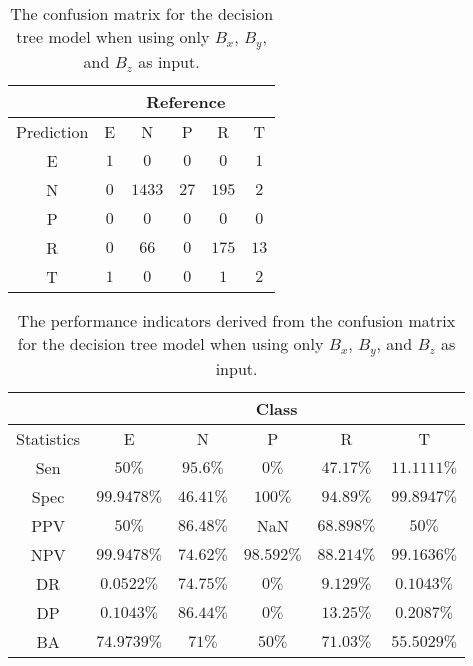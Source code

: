 \begin{table}[!ht]
	\centering
	\begin{tabular}{|c|c|c|c|c|c|}
		\hline
		 & \multicolumn{5}{|c|}{Reference} \\ \hline
		 Prediction & E & N & P & R & T \\ \hline
		 E & $1$ & $0$ & $0$ & $0$ & $1$ \\ \hline
		 N & $0$ & $1433$ & $27$ & $195$ & $2$ \\ \hline
		 P & $0$ & $0$ & $0$ & $0$ & $0$ \\ \hline
		 R & $0$ & $66$ & $0$ & $175$ & $13$ \\ \hline
		 T & $1$ & $0$ & $0$ & $1$ & $2$ \\ \hline
	\end{tabular}
	\caption{The confusion matrix for the decision tree model when using only $B_{x}$, $B_{y}$, and $B_{z}$ as input.}
	\label{tab:cm:coord:C5.0}
\end{table}

\begin{table}[!ht]
	\centering
	\begin{tabular}{|c|c|c|c|c|c|}
		\hline
		 & \multicolumn{5}{c|}{Class} \\ \hline
		Statistics & E & N & P & R & T \\ \hline
		Sen & $50\%$ & $95.6\%$ & $0\%$ & $47.17\%$ & $11.1111\%$ \\ \hline
		Spec & $99.9478\%$ & $46.41\%$ & $100\%$ & $94.89\%$ & $99.8947\%$ \\ \hline
		PPV & $50\%$ & $86.48\%$ & NaN & $68.898\%$ & $50\%$ \\ \hline
		NPV & $99.9478\%$ & $74.62\%$ & $98.592\%$ & $88.214\%$ & $99.1636\%$ \\ \hline
		DR & $0.0522\%$ & $74.75\%$ & $0\%$ & $9.129\%$ & $0.1043\%$ \\ \hline
		DP & $0.1043\%$ & $86.44\%$ & $0\%$ & $13.25\%$ & $0.2087\%$ \\ \hline
		BA & $74.9739\%$ & $71\%$ & $50\%$ & $71.03\%$ & $55.5029\%$ \\ \hline
	\end{tabular}
	\caption{The performance indicators derived from the confusion matrix for the decision tree model when using only $B_{x}$, $B_{y}$, and $B_{z}$ as input.}
	\label{tab:cs:reverse:coord:C5.0}
\end{table}

